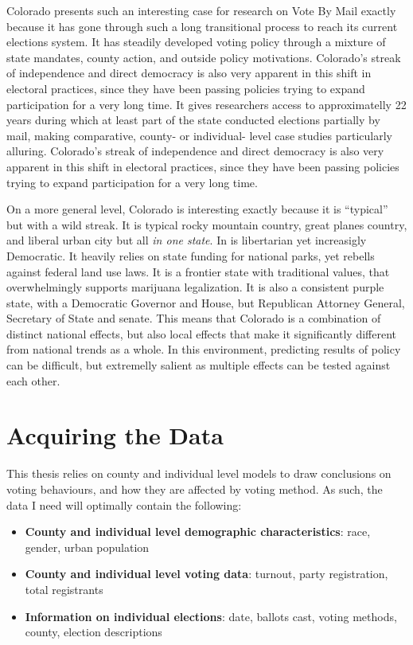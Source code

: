 \documentclass[12pt,twoside]{reedthesis}
\begin{document}
  Colorado presents such an interesting case for research on Vote By Mail
  exactly because it has gone through such a long transitional process to
  reach its current elections system. It has steadily developed voting
  policy through a mixture of state mandates, county action, and outside
  policy motivations. Colorado's streak of independence and direct
  democracy is also very apparent in this shift in electoral practices,
  since they have been passing policies trying to expand participation for
  a very long time. It gives researchers access to approximatelly 22 years
  during which at least part of the state conducted elections partially by
  mail, making comparative, county- or individual- level case studies
  particularly alluring. Colorado's streak of independence and direct
  democracy is also very apparent in this shift in electoral practices,
  since they have been passing policies trying to expand participation for
  a very long time.
  
  On a more general level, Colorado is interesting exactly because it is
  ``typical'' but with a wild streak. It is typical rocky mountain
  country, great planes country, and liberal urban city but all \emph{in
  one state}. In is libertarian yet increasigly Democratic. It heavily
  relies on state funding for national parks, yet rebells against federal
  land use laws. It is a frontier state with traditional values, that
  overwhelmingly supports marijuana legalization. It is also a consistent
  purple state, with a Democratic Governor and House, but Republican
  Attorney General, Secretary of State and senate. This means that
  Colorado is a combination of distinct national effects, but also local
  effects that make it significantly different from national trends as a
  whole. In this environment, predicting results of policy can be
  difficult, but extremelly salient as multiple effects can be tested
  against each other.
  
  \section{Acquiring the Data}\label{acquiring-the-data}
  
  This thesis relies on county and individual level models to draw
  conclusions on voting behaviours, and how they are affected by voting
  method. As such, the data I need will optimally contain the following:
  
  \begin{itemize}
  \item
    \textbf{County and individual level demographic characteristics}:
    race, gender, urban population
  \item
    \textbf{County and individual level voting data}: turnout, party
    registration, total registrants
  \item
    \textbf{Information on individual elections}: date, ballots cast,
    voting methods, county, election descriptions
  \end{itemize}
  
\end{document}
